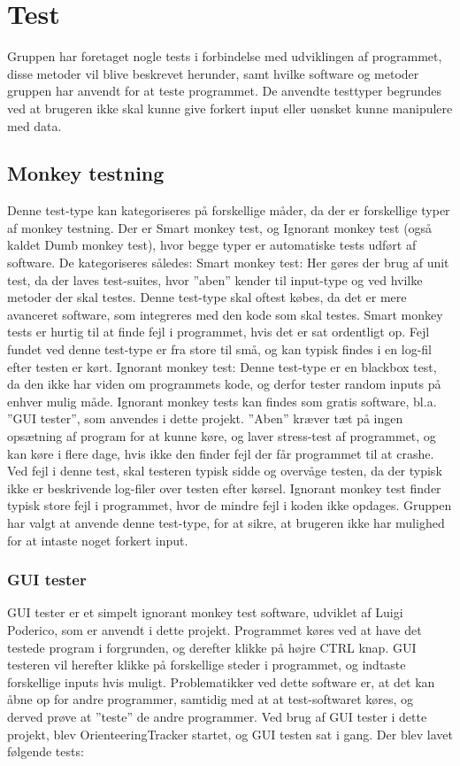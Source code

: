 \chapter{Test}
Gruppen har foretaget nogle tests i forbindelse med udviklingen af programmet, disse metoder vil blive beskrevet herunder, samt hvilke software og metoder gruppen har anvendt for at teste programmet. De anvendte testtyper begrundes ved at brugeren ikke skal kunne give forkert input eller uønsket kunne manipulere med data.

\section{Monkey testning}
Denne test-type kan kategoriseres på forskellige måder, da der er forskellige typer af monkey testning. Der er Smart monkey test, og Ignorant monkey test (også kaldet Dumb monkey test), hvor begge typer er automatiske tests udført af software. De kategoriseres således:
Smart monkey test: Her gøres der brug af unit test, da der laves test-suites, hvor ”aben” kender til input-type og ved hvilke metoder der skal testes. Denne test-type skal oftest købes, da det er mere avanceret software, som integreres med den kode som skal testes.\newline
Smart monkey tests er hurtig til at finde fejl i programmet, hvis det er sat ordentligt op. Fejl fundet ved denne test-type er fra store til små, og kan typisk findes i en log-fil efter testen er kørt.\newline
Ignorant monkey test: Denne test-type er en blackbox test, da den ikke har viden om programmets kode, og derfor tester random inputs på enhver mulig måde. Ignorant monkey tests kan findes som gratis software, bl.a. ”GUI tester”, som anvendes i dette projekt. ”Aben” kræver tæt på ingen opsætning af program for at kunne køre, og laver stress-test af programmet, og kan køre i flere dage, hvis ikke den finder fejl der får programmet til at crashe. Ved fejl i denne test, skal testeren typisk sidde og overvåge testen, da der typisk ikke er beskrivende log-filer over testen efter kørsel. Ignorant monkey test finder typisk store fejl i programmet, hvor de mindre fejl i koden ikke opdages. \citep{ExI}\newline
Gruppen har valgt at anvende denne test-type, for at sikre, at brugeren ikke har mulighed for at intaste noget forkert input.

\subsection{GUI tester}
GUI tester er et simpelt ignorant monkey test software, udviklet af Luigi Poderico, som er anvendt i dette projekt. Programmet køres ved at have det testede program i forgrunden, og derefter klikke på højre CTRL knap. GUI testeren vil herefter klikke på forskellige steder i programmet, og indtaste forskellige inputs hvis muligt. Problematikker ved dette software er, at det kan åbne op for andre programmer, samtidig med at at test-softwaret køres, og derved prøve at ”teste” de andre programmer. \citep{GUItester} \newline
Ved brug af GUI tester i dette projekt, blev OrienteeringTracker startet, og GUI testen sat i gang. Der blev lavet følgende tests:

